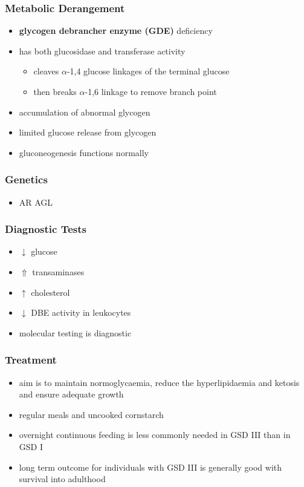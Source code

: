 \documentclass[12pt]{scrartcl}
\begin{document}
\subsubsection{Metabolic Derangement}
\label{sec:orga9d2619}
\begin{itemize}
\item \textbf{glycogen debrancher enzyme (GDE)} deficiency
\item has both glucosidase and transferase activity
\begin{itemize}
\item cleaves \(\alpha\)-1,4 glucose linkages of the terminal glucose
\item then breaks \(\alpha\)-1,6 linkage to remove branch point
\end{itemize}
\item accumulation of abnormal glycogen
\item limited glucose release from glycogen
\item gluconeogenesis functions normally
\end{itemize}
\subsubsection{Genetics}
\label{sec:org768f47e}
\begin{itemize}
\item AR AGL
\end{itemize}
\subsubsection{Diagnostic Tests}
\label{sec:org959f540}
\begin{itemize}
\item \(\downarrow\) glucose
\item \(\Uparrow\) transaminases
\item \(\uparrow\) cholesterol
\item \(\downarrow\) DBE activity in leukocytes
\item molecular testing is diagnostic
\end{itemize}
\subsubsection{Treatment}
\label{sec:orge7b0d53}
\begin{itemize}
\item aim is to maintain normoglycaemia, reduce the hyperlipidaemia and ketosis and
ensure adequate growth
\item regular meals and uncooked cornstarch
\item overnight continuous feeding is less commonly needed in GSD III than
in GSD I
\item long term outcome for individuals with GSD III is generally good
with survival into adulthood
\end{itemize}
\end{document}
